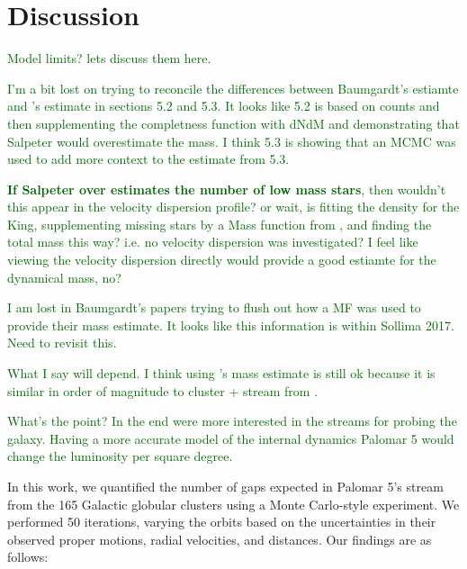 \documentclass[draft]{aa}
\newcommand{\salvatore}[1]{\textcolor{darkgreen}{{#1}}}
\begin{document}
\section{Discussion}


  \salvatore{Model limits? lets discuss them here.}


  \salvatore{I'm a bit lost on trying to reconcile the differences between Baumgardt's estiamte and \citet{2017ApJ...842..120I}'s estimate in sections 5.2 and 5.3. It looks like 5.2 is based on counts and then supplementing the completness function with dNdM \citet{2001AJ....122.3231G} and demonstrating that Salpeter would overestimate the mass. I think 5.3 is showing that an MCMC was used to add more context to the estimate from 5.3.}
    
  \salvatore{\textbf{If Salpeter over estimates the number of low mass stars}, then wouldn't this appear in the velocity dispersion profile? or wait, is \citet{2017ApJ...842..120I} fitting the density for the King, supplementing missing stars by a Mass function from \citet{2001AJ....122.3231G}, and finding the total mass this way? i.e. no velocity dispersion was investigated? I feel like viewing the velocity dispersion directly would provide a good estiamte for the dynamical mass, no?}
  
  \salvatore{I am lost in Baumgardt's papers trying to flush out how a MF was used to provide their mass estimate. It looks like this information is within Sollima 2017. Need to revisit this. }

  \salvatore{What I say will depend. I think using \citet{2021MNRAS.505.5957B}'s mass estimate is still ok because it is similar in order of magnitude to cluster + stream from \citet{2017ApJ...842..120I}. }

  \salvatore{What's the point? In the end were more interested in the streams for probing the galaxy. Having a more accurate model of the internal dynamics Palomar 5 would change the luminosity per square degree. }


  In this work, we quantified the number of gaps expected in Palomar 5's stream from the 165 Galactic globular clusters using a Monte Carlo-style experiment. We performed 50 iterations, varying the orbits based on the uncertainties in their observed proper motions, radial velocities, and distances. Our findings are as follows:
\end{document}
